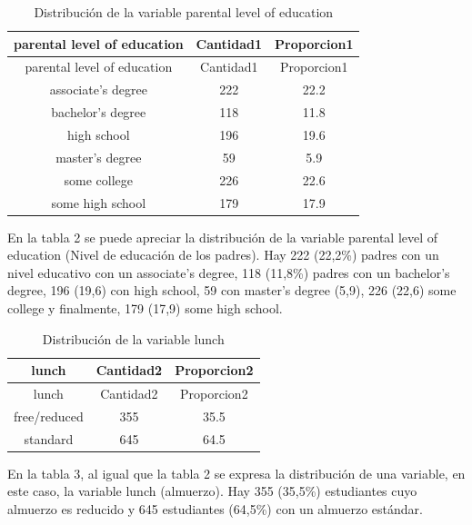 \documentclass[
]{article}
\begin{document}
\begin{longtable}[]{@{}ccc@{}}
\caption{Distribución de la variable parental level of
education}\tabularnewline
\toprule\noalign{}
parental level of education & Cantidad1 & Proporcion1 \\
\midrule\noalign{}
\endfirsthead
\toprule\noalign{}
parental level of education & Cantidad1 & Proporcion1 \\
\midrule\noalign{}
\endhead
\bottomrule\noalign{}
\endlastfoot
associate's degree & 222 & 22.2 \\
bachelor's degree & 118 & 11.8 \\
high school & 196 & 19.6 \\
master's degree & 59 & 5.9 \\
some college & 226 & 22.6 \\
some high school & 179 & 17.9 \\
\end{longtable}

En la tabla 2 se puede apreciar la distribución de la variable parental
level of education (Nivel de educación de los padres). Hay 222 (22,2\%)
padres con un nivel educativo con un associate's degree, 118 (11,8\%)
padres con un bachelor's degree, 196 (19,6) con high school, 59 con
master's degree (5,9), 226 (22,6) some college y finalmente, 179 (17,9)
some high school.

\begin{longtable}[]{@{}ccc@{}}
\caption{Distribución de la variable lunch}\tabularnewline
\toprule\noalign{}
lunch & Cantidad2 & Proporcion2 \\
\midrule\noalign{}
\endfirsthead
\toprule\noalign{}
lunch & Cantidad2 & Proporcion2 \\
\midrule\noalign{}
\endhead
\bottomrule\noalign{}
\endlastfoot
free/reduced & 355 & 35.5 \\
standard & 645 & 64.5 \\
\end{longtable}

En la tabla 3, al igual que la tabla 2 se expresa la distribución de una
variable, en este caso, la variable lunch (almuerzo). Hay 355 (35,5\%)
estudiantes cuyo almuerzo es reducido y 645 estudiantes (64,5\%) con un
almuerzo estándar.
\end{document}
